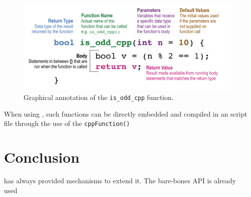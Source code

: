 \documentclass[9pt,twocolumn,twoside,printwatermark=false]{pinp}
\begin{document}
\begin{figure}
  \begin{center}
    \includegraphics[width=5.5in]{figures/function_annotation_cpp.png}
    \caption{Graphical annotation of the \texttt{is\_odd\_cpp} function.}
    \label{fig:cpp-function-annotation}
  \end{center}
\end{figure}

When using \rcppns, such \cpp functions can be directly embedded and
compiled in an \rlang
script file through the use of the \texttt{cppFunction()}

\section{Conclusion}\label{conclusion}

\rlang has always provided mechanisms to extend it. The bare-bones
\clang API is already used

\showacknow

\pnasbreak 



\end{document}
